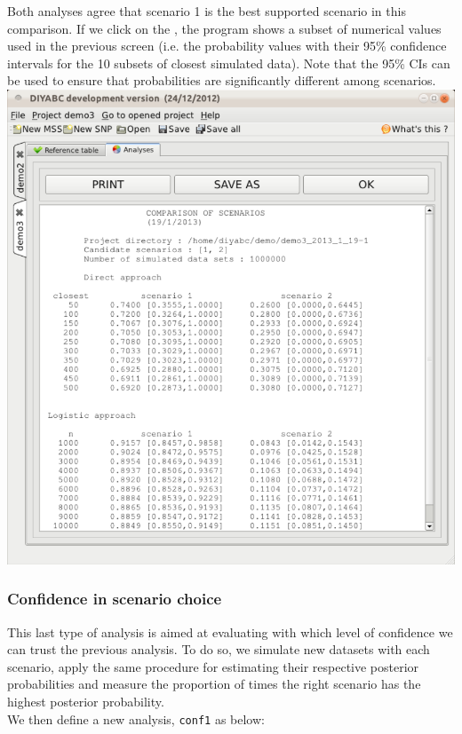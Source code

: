 Both analyses agree that scenario 1 is the best supported scenario in this comparison. If we click on the , the program shows a subset of numerical values used in the previous screen (i.e. the probability values with their 95\% confidence intervals for the 10 subsets of closest simulated data). Note that the 95\% CIs can be used to ensure that probabilities are significantly different among scenarios.\\

 \includegraphics[scale=0.3]{gui_pictures/Capture-DIYABC-112.png} \\

\subsubsection{Confidence in scenario choice}

This last type of analysis is aimed at evaluating with which level of confidence we can trust the previous analysis. To do so, we simulate new datasets with each scenario, apply the same procedure for estimating their respective posterior probabilities and measure the proportion of times the right scenario has the highest posterior probability.\\
We then define a new analysis, \texttt{conf1} as below:\\   

